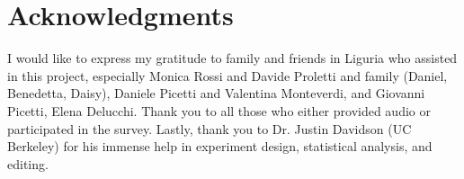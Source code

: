 \documentclass[output=paper,colorlinks,citecolor=brown]{langscibook}
\begin{document}
\section*{Acknowledgments}
I would like to express my gratitude to family and friends in Liguria who assisted in this project, especially Monica Rossi and Davide Proletti and family (Daniel, Benedetta, Daisy), Daniele Picetti and Valentina Monteverdi, and Giovanni Picetti, Elena Delucchi. Thank you to all those who either provided audio or participated in the survey. Lastly, thank you to Dr. Justin Davidson (UC Berkeley) for his immense help in experiment design, statistical analysis, and editing.

\nocite{*}
\printbibliography[heading=subbibliography,notkeyword=this]
\end{document}
